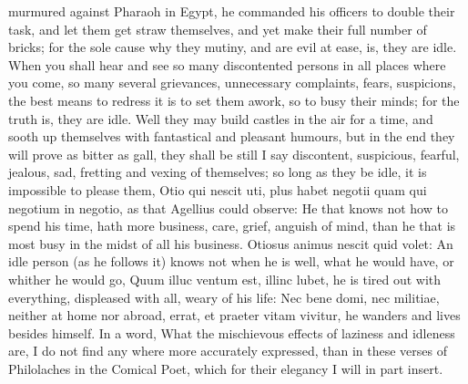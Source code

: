 {{murmured against Pharaoh in Egypt, he commanded his officers to double
their task, and let them get straw themselves, and yet make their full
number of bricks; for the sole cause why they mutiny, and are evil at
ease, is, they are idle. When you shall hear and see so many
discontented persons in all places where you come, so many several
grievances, unnecessary complaints, fears, suspicions, the best
means to redress it is to set them awork, so to busy their minds; for
the truth is, they are idle. Well they may build castles in the air for
a time, and sooth up themselves with fantastical and pleasant humours,
but in the end they will prove as bitter as gall, they shall be still I
say discontent, suspicious, fearful, jealous, sad, fretting and
vexing of themselves; so long as they be idle, it is impossible to
please them, Otio qui nescit uti, plus habet negotii quam qui negotium
in negotio, as that Agellius could observe: He that knows not how
to spend his time, hath more business, care, grief, anguish of mind,
than he that is most busy in the midst of all his business. Otiosus
animus nescit quid volet: An idle person (as he follows it) knows not
when he is well, what he would have, or whither he would go, Quum illuc
ventum est, illinc lubet, he is tired out with everything, displeased
with all, weary of his life: Nec bene domi, nec militiae, neither at
home nor abroad, errat, et praeter vitam vivitur, he wanders and lives
besides himself. In a word, What the mischievous effects of laziness
and idleness are, I do not find any where more accurately expressed,
than in these verses of Philolaches in the Comical Poet, which
for their elegancy I will in part insert.

}}
